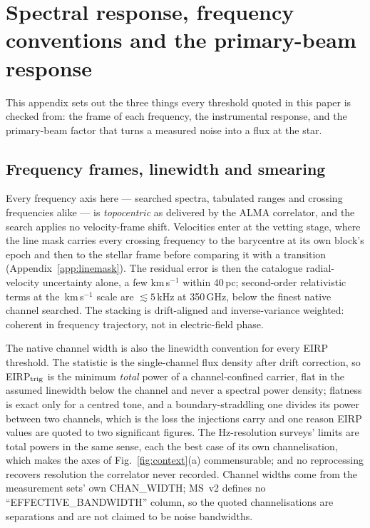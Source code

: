 \section{Spectral response, frequency conventions and the primary-beam
response}
\label{app:conventions}

This appendix sets out the three things every threshold quoted in this paper
is checked from: the frame of each frequency, the instrumental response, and
the primary-beam factor that turns a measured noise into a flux at the star.


\subsection{Frequency frames, linewidth and smearing}

Every frequency axis here --- searched spectra, tabulated ranges and
crossing frequencies alike --- is \emph{topocentric} as delivered by the
ALMA correlator, and the search applies no velocity-frame shift.
Velocities enter at the vetting stage, where the line mask carries every
crossing frequency to the barycentre at its own block's epoch and then to the
stellar frame before comparing it with a transition
(Appendix~\ref{app:linemask}). The residual error is then the catalogue
radial-velocity uncertainty alone, a few km\,s$^{-1}$ within 40\,pc;
second-order relativistic terms at the \MaskHalfKms\,km\,s$^{-1}$
scale are $\lesssim5$\,kHz at 350\,GHz, below the finest native channel
searched. The stacking is drift-aligned and inverse-variance weighted:
coherent in frequency trajectory, not in electric-field phase.

The native channel width is also the linewidth convention for every EIRP
threshold. The statistic is the single-channel flux density after drift
correction, so EIRP$_{\rm trig}$ is the minimum \emph{total} power of a
channel-confined carrier, flat in the assumed linewidth below the channel and
never a spectral power density; flatness is exact only for a centred tone,
and a boundary-straddling one divides its power between two channels, which
is the loss the injections carry and one reason EIRP values are quoted to two
significant figures. The Hz-resolution
surveys' limits are total powers in the same sense, each the best case of
its own channelisation, which makes the axes of Fig.~\ref{fig:context}(a)
commensurable; and no reprocessing recovers resolution the correlator never
recorded. Channel widths come from the measurement sets' own CHAN\_WIDTH;
MS~v2 defines no ``EFFECTIVE\_BANDWIDTH'' column, so the quoted
channelisations are separations and are not claimed to be noise bandwidths.

